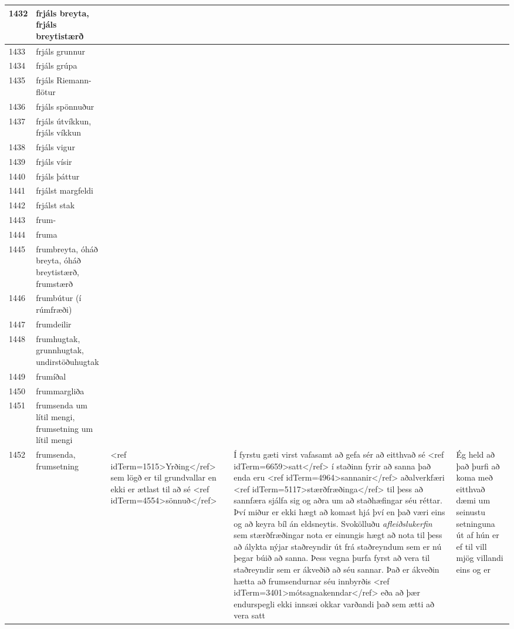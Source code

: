 \begin{longtable}{p{}|p{}|p{}|p{}|p{}}
1432 & frjáls breyta, frjáls breytistærð &  &  &  \\
\hline
1433 & frjáls grunnur &  &  &  \\
\hline
1434 & frjáls grúpa &  &  &  \\
\hline
1435 & frjáls Riemann-flötur &  &  &  \\
\hline
1436 & frjáls spönnuður &  &  &  \\
\hline
1437 & frjáls útvíkkun, frjáls víkkun &  &  &  \\
\hline
1438 & frjáls vigur &  &  &  \\
\hline
1439 & frjáls vísir &  &  &  \\
\hline
1440 & frjáls þáttur &  &  &  \\
\hline
1441 & frjálst margfeldi &  &  &  \\
\hline
1442 & frjálst stak &  &  &  \\
\hline
1443 & frum- &  &  &  \\
\hline
1444 & fruma &  &  &  \\
\hline
1445 & frumbreyta, óháð breyta, óháð breytistærð, frumstærð &  &  &  \\
\hline
1446 & frumbútur (í rúmfræði) &  &  &  \\
\hline
1447 & frumdeilir &  &  &  \\
\hline
1448 & frumhugtak, grunnhugtak, undirstöðuhugtak & &  &  \\
\hline
1449 & frumíðal &  &  &  \\
\hline
1450 & frummargliða &  &  &  \\
\hline
1451 & frumsenda um lítil mengi, frumsetning um lítil mengi &  &  &  \\
\hline
1452 & frumsenda, frumsetning & <ref idTerm=1515>Yrðing</ref> sem lögð er til grundvallar en ekki er ætlast til að sé <ref idTerm=4554>sönnuð</ref> & Í fyrstu gæti virst vafasamt að gefa sér að eitthvað sé <ref idTerm=6659>satt</ref> í staðinn fyrir að sanna það enda eru <ref idTerm=4964>sannanir</ref> aðalverkfæri <ref idTerm=5117>stærðfræðinga</ref> til þess að sannfæra sjálfa sig og aðra um að staðhæfingar séu réttar. Því miður er ekki hægt að komast hjá því en það væri eins og að keyra bíl án eldsneytis. Svokölluðu \textit{afleiðslukerfin} sem stærðfræðingar nota er einungis hægt að nota til þess að álykta nýjar staðreyndir út frá staðreyndum sem er nú þegar búið að sanna. Þess vegna þurfa fyrst að vera til staðreyndir sem er ákveðið að séu sannar. Það er ákveðin hætta að frumsendurnar séu innbyrðis <ref idTerm=3401>mótsagnakenndar</ref> eða að þær endurspegli ekki innsæi okkar varðandi það sem ætti að vera satt & Ég held að það þurfi að koma með eitthvað dæmi um seinustu setninguna út af hún er ef til vill mjög villandi eins og er \\

\end{longtable}
